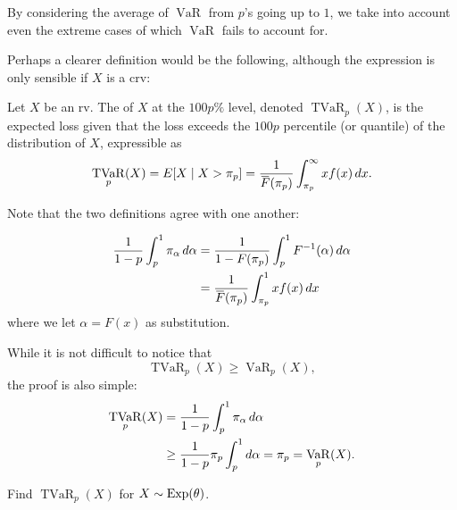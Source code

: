 \documentclass[notoc,notitlepage]{tufte-book}
\DeclareMathOperator{\VaR}{VaR}
\DeclareMathOperator{\TVaR}{TVaR}
\begin{document}
\begin{remark}
  By considering the average of $\VaR$ from $p$'s going up to $1$, we take into account even the extreme cases of which $\VaR$ fails to account for.
\end{remark}

Perhaps a clearer definition would be the following, although the expression is only sensible if $X$ is a crv:

\begin{defn}\label{defn:tail_value_at_risk_v2}
  Let $X$ be an rv. The  of $X$ at the $100p\%$ level, denoted $\TVaR_p(X)$, is the expected loss given that the loss exceeds the $100p$ percentile (or quantile) of the distribution of $X$, expressible as
  \begin{equation*}
    \TVaR_p(X) = E[ X \mid X > \pi_p ] = \frac{1}{\bar{F}(\pi_p)} \int_{\pi_p}^{\infty} x f(x) \dif{x}.
  \end{equation*}
\end{defn}

Note that the two definitions agree with one another:

\begin{align*}
  \frac{1}{1 - p} \int_{p}^{1} \pi_\alpha \dif{\alpha} &= \frac{1}{1 - F(\pi_p)} \int_{p}^{1} F^{-1}(\alpha) \dif{\alpha} \\
                                                       &= \frac{1}{\bar{F}(\pi_p)} \int_{\pi_p}^{1} x f(x) \dif{x}
\end{align*}
where we let $\alpha = F(x)$ as substitution.

\begin{note}
  While it is not difficult to notice that
  \begin{equation*}
    \TVaR_p(X) \geq \VaR_p(X),
  \end{equation*}
  the proof is also simple:
  \begin{align*}
    \TVaR_p(X) &= \frac{1}{1 - p} \int_{p}^{1} \pi_\alpha \dif{\alpha} \\
               &\geq \frac{1}{1 - p} \pi_p \int_{p}^{1} \dif{\alpha} = \pi_p = \VaR_p(X).
  \end{align*}
\end{note}

\begin{eg}
  Find $\TVaR_p(X)$ for $X \sim \operatorname{Exp}(\theta)$.
\end{eg}
\end{document}
